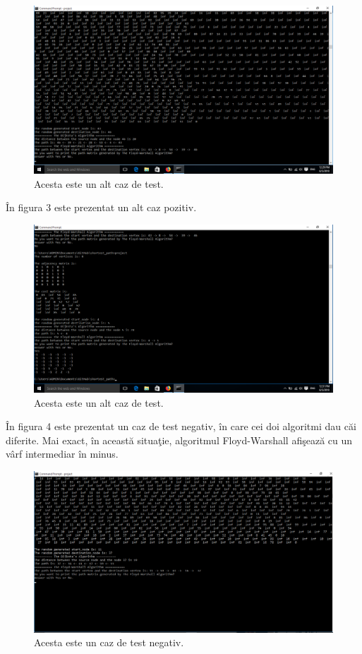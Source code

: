 \documentclass{article}
\begin{document}
\begin{figure}[htp]
\centering
\includegraphics[width=12cm]{Test2.png}
\caption{Acesta este un alt caz de test.}
\label{fig:2}
\end{figure}



\^{I}n figura 3 este prezentat un alt caz pozitiv.\\
\begin{figure}[htp]
\centering
\includegraphics[width=12cm]{Test1.png}
\caption{Acesta este un alt caz de test.}
\label{fig:3}
\end{figure}



\^{I}n figura 4 este prezentat un caz de test negativ, \^{i}n care cei doi algoritmi dau c\u{a}i diferite. Mai exact, \^{i}n aceast\u{a} situa\c{t}ie, algoritmul Floyd-Warshall afi\c{s}eaz\u{a} cu un v\^{a}rf intermediar \^{i}n minus.
\begin{figure}[htp]
\centering
\includegraphics[width=12cm]{Test3.png}
\caption{Acesta este un caz de test negativ.}
\label{fig:4}
\end{figure}\\
\end{document}

